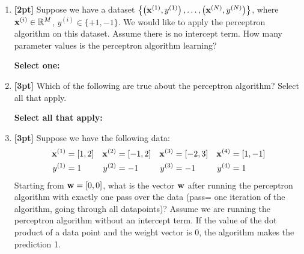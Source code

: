\begin{enumerate}
    
    
    \clearpage
    
    \item \textbf{[2pt]} Suppose we have a dataset $\left\{ \left(\mathbf{x}^{(1)},y^{(1)}\right),\ldots, \left(\mathbf{x}^{(N)},y^{(N)}\right) \right\}$, where $\mathbf{x}^{(i)} \in \mathbb{R}^M$, $y^{(i)}\in\{+1,-1\}$. We would like to apply the perceptron algorithm on this dataset. Assume there is no intercept term. How many parameter values is the perceptron algorithm learning?

    \textbf{Select one:}


    
    \item \textbf{[3pt]} Which of the following are true about the perceptron algorithm? Select all that apply.

    \textbf{Select all that apply:}

    
    
    \item \textbf{[3pt]} Suppose we have the following data:     \begin{align*}
        \mathbf{x}^{(1)} &= [1,2] & \mathbf{x}^{(2)} &= [-1,2] & \mathbf{x}^{(3)} &= [-2,3] & \mathbf{x}^{(4)} &= [1,-1] \\
        y^{(1)} &= 1 & y^{(2)} &= -1 & y^{(3)} &= -1 & y^{(4)} &= 1
    \end{align*}
    Starting from $\mathbf{w} = [0,0]$, what is the vector $\mathbf{w}$ after running the perceptron algorithm with exactly one pass over the data (pass= one iteration of the algorithm, going through all datapoints)? Assume we are running the perceptron algorithm without an intercept term. If the value of the dot product of a data point and the weight vector is $0$, the algorithm makes the prediction 1.


\end{enumerate}
